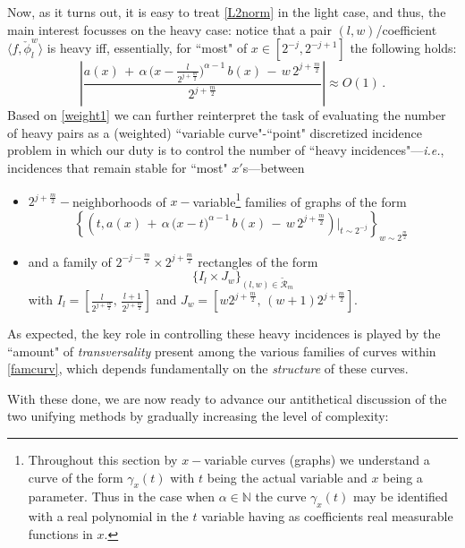 \documentclass[a4paper,reqno]{amsart}
\numberwithin{equation}{section}
\theoremstyle{definition}
\newcommand{\N}{\mathbb{N}}
\def\a{\alpha}
\def\r{\mathcal{R}}
\def\g{\gamma}
\begin{document}
Now, as it turns out, it is easy to treat \eqref{L2norm} in the light case, and thus, the main interest focusses on the heavy case: notice that a pair $(l,w)$/coefficient $\langle f,  \check{\phi}_{l}^w\rangle$ is heavy iff, essentially, for ``most" of
$x\in [2^{-j},2^{-j+1}]$ the following holds:
\begin{equation}\label{weight1}
\left|\frac{a(x)\,+\,\a\,\big(x-\frac{l}{2^{j+\frac{m}{2}}}\big)^{\a-1}\,b(x)\,-\,w\,2^{j+\frac{m}{2}}}{2^{j+\frac{m}{2}}}\right|\approx O(1)\,.
\end{equation}
Based on \eqref{weight1} we can further reinterpret the task of evaluating the number of heavy pairs as a (weighted) ``variable curve"-``point" discretized incidence problem in which our duty is to control the number of ``heavy incidences"---\textit{i.e.}, incidences that remain stable for ``most" $x'$s---between
\begin{itemize}
\item $2^{j+\frac{m}{2}}-$neighborhoods of $x-$variable\footnote{Throughout this section by $x-$variable curves (graphs) we understand a curve of the form $\g_x(t)$ with $t$ being the actual variable and $x$ being a parameter. Thus in the case when $\a\in\N$ the curve $\g_x(t)$ may be identified with a real polynomial in the $t$ variable having as coefficients real measurable functions in $x$.} families of graphs of the form
\begin{equation}\label{famcurv}
\left\{\left(t,a(x)\,+\,\a\,\big(x-t\big)^{\a-1}\,b(x)\,-\,w\,2^{j+\frac{m}{2}}\right)\Big|_{t\sim 2^{-j}}\right\}_{w\sim 2^{\frac{m}{2}}}\;
\end{equation}
\item and a family of $2^{-j-\frac{m}{2}}\times 2^{j+\frac{m}{2}}$ rectangles of the form
\begin{equation}\label{fampoint}
\{I_l\times J_w\}_{(l,w)\in \tilde{\r}_m}
\end{equation}
with $I_l=[\frac{l}{2^{j+\frac{m}{2}}},\,\frac{l+1}{2^{j+\frac{m}{2}}}]$ and $J_w=[w 2^{j+\frac{m}{2}},\, (w+1)2^{j+\frac{m}{2}}]$.
\end{itemize}

As expected, the key role in controlling these heavy incidences is played by the ``amount" of \emph{transversality} present among the various families of curves within \eqref{famcurv}, which depends fundamentally on the \emph{structure} of these curves.

With these done, we are now ready to advance our antithetical discussion of the two unifying methods by gradually increasing the level of complexity:
\end{document}

